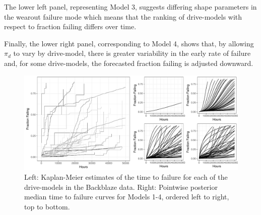 \documentclass[12pt]{article}
\begin{document}
The lower left panel, representing Model 3, suggests differing shape parameters in the wearout failure mode which means that the ranking of drive-models with respect to fraction failing differs over time.

Finally, the lower right panel, corresponding to Model 4, shows that, by allowing $\pi_d$ to vary by drive-model, there is greater variability in the early rate of failure and, for some drive-models, the forecasted fraction failing is adjusted downward. 

\begin{figure}[H]
\includegraphics[width=\textwidth]{fig/heterogeneity-compare-preliminary}
\caption{Left: Kaplan-Meier estimates of the time to failure for each of the drive-models in the Backblaze data. Right: Pointwise posterior median time to failure curves for Models 1-4, ordered left to right, top to bottom.}
\label{fig2}
\end{figure}
\end{document}
